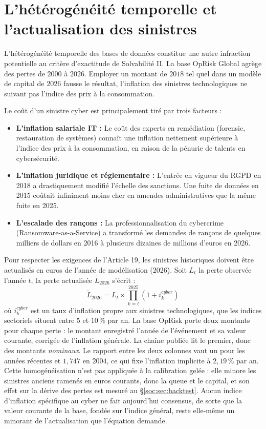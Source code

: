 \section{L'hétérogénéité temporelle et l'actualisation des sinistres}

L'hétérogénéité temporelle des bases de données constitue une autre infraction potentielle au critère d'exactitude de Solvabilité II. La base OpRisk Global agrège des pertes de $2000$ à $2026$. Employer un montant de $2018$ tel
quel dans un modèle de capital de $2026$ fausse le résultat, l'inflation des sinistres
technologiques ne suivant pas l'indice des prix à la consommation.

Le coût d'un sinistre cyber est principalement tiré par trois facteurs :
\begin{itemize}
    \item \textbf{L'inflation salariale IT :} Le coût des experts en remédiation (forensic, restauration de systèmes) connaît une inflation nettement supérieure à l'indice des prix à la consommation, en raison de la pénurie de talents en cybersécurité.
    \item \textbf{L'inflation juridique et réglementaire :} L'entrée en vigueur du RGPD en 2018 a drastiquement modifié l'échelle des sanctions. Une fuite de données en 2015 coûtait infiniment moins cher en amendes administratives que la même fuite en 2025.
    \item \textbf{L'escalade des rançons :} La professionnalisation du cybercrime (Ransomware-as-a-Service) a transformé les demandes de rançons de quelques milliers de dollars en 2016 à plusieurs dizaines de millions d'euros en 2026.
\end{itemize}

Pour respecter les exigences de l'Article 19, les sinistres historiques doivent être actualisés en euros de l'année de modélisation (2026). Soit $L_t$ la perte observée l'année $t$, la perte actualisée $\tilde{L}_{2026}$ s'écrit :
\begin{equation}
\tilde{L}_{2026} = L_t \times \prod_{k=t}^{2025} (1 + i_k^{cyber})
\end{equation}
où $i_k^{cyber}$ est un taux d'inflation propre aux sinistres technologiques, que les indices
sectoriels situent entre $5$ et $10\,\%$ par an. La base OpRisk porte deux montants pour chaque
perte : le montant enregistré l'année de l'événement et sa valeur courante, corrigée de
l'inflation générale. La chaîne publiée lit le premier, donc des montants \emph{nominaux}. Le
rapport entre les deux colonnes vaut un pour les années récentes et $1{,}747$ en $2004$, ce qui
fixe l'inflation implicite à $2{,}19\,\%$ par an. Cette homogénéisation n'est pas appliquée à la
calibration gelée : elle minore les sinistres anciens ramenés en euros courants, donc la queue et
le capital, et son effet sur la dérive des pertes est mesuré au \S\ref{soc:sec:backtest}. Aucun
indice d'inflation spécifique au cyber ne fait aujourd'hui consensus, de sorte que la valeur
courante de la base, fondée sur l'indice général, reste elle-même un minorant de l'actualisation
que l'équation demande.

